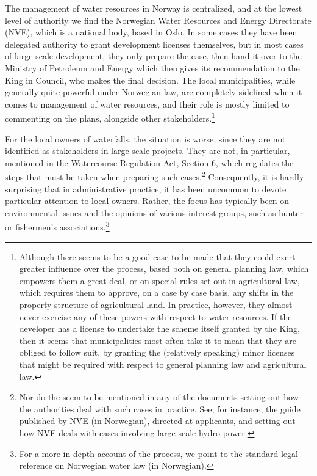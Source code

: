 The management of water resources in Norway is centralized, and at the lowest level of authority we find the Norwegian Water Resources and Energy Directorate (NVE), which is a national body, based in Oslo. In some cases they have been delegated authority to grant development licenses themselves, but in most cases of large scale development, they only prepare the case, then hand it over to the Ministry of Petroleum and Energy which then gives its recommendation to the King in Council, who makes the final decision. The local municipalities, while generally quite powerful under Norwegian law, are completely sidelined when it comes to management of water resources, and their role is mostly limited to commenting on the plans, alongside other stakeholders.\footnote{Although there seems to be a good case to be made that they could exert greater influence over the process, based both on general planning law, which empowers them a great deal, or on special rules set out in agricultural law, which requires them to approve, on a case by case basis, any shifts in the property structure of agricultural land. In practice, however, they almost never exercise any of these powers with respect to water resources. If the developer has a license to undertake the scheme itself granted by the King, then it seems that municipalities most often take it to mean that they are obliged to follow suit, by granting the (relatively speaking) minor licenses that might be required with respect to general planning law and agricultural law.}

For the local owners of waterfalls, the situation is worse, since they are not identified as stakeholders in large scale projects. They are not, in particular, mentioned in the Watercourse Regulation Act, Section 6, which regulates the steps that must be taken when preparing such cases.\footnote{Nor do the seem to be mentioned  in any of the documents setting out how the authorities deal with such cases in practice. See, for instance, the guide published by NVE \cite{rettleiar} (in Norwegian), directed at applicants, and setting out how NVE deals with cases involving large scale hydro-power.} Consequently, it is hardly surprising that in administrative practice, it has been uncommon to devote particular attention to local owners. Rather, the focus has typically been on environmental issues and the opinions of various interest groups, such as hunter or fishermen's associations.\footnote{For a more in depth account of the process, we point to the standard legal reference on Norwegian water law \cite{falk}(in Norwegian).}

